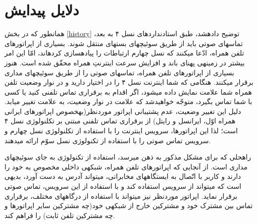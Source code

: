 \section{دلایل پیدایش }
همانطور که در بخش \ref{history} توضیح داده\nf شد، طبق استادنداردهای نسل ۴ به بعد، تماس\nf های صوتی باید از طریق سوئیچ\nf های بسته\nf ای منتقل شوند. بسیاری از اپراتورهای تلفن همراه، ادّعا می\nf کنند که نسل چهارم ارتباطات را پیاده\nf سازی کرده\nf اند، امّا این امر بیشتر در زمینه\nf ی پهنای باند و افزایش سرعت اینترنتِ همراه محقّق شده است. هنوز بسیاری از اپراتورهای تلفن همراه، تماس\nf های صوتی را از طریق سوئیچ\nf های مداری برقرار می\nf کنند. هنگامی که شما اینترنت نسل ۴ را در اختیار دارید و در نوار وضعیت تلفن همراه شما علامت  نمایش داده می\nf شود، اگر اقدام به برقراری تماس تلفنی کنید یا کسی با شما تماس بگیرد، متوجّه خواهیدشد که علامت  در نوار وضعیت، به علامت  تغییر میابد. دلیل این تغییر وضعیت، عدم پشتیبانی اپراتور موردنظر(به\nf خصوص اپراتورهای ایرانی همراه اوّل، ایرانسل و رایتل) از برقراری تماس تلفنی مبتنی بر تکلنولوژی نسل ۴ است؛ لذا این اپراتورها، سرویس اینترنت را با استفاده از تکلنولوژی نسل چهارم و سرویس تماس صوتی را با استفاده از تکنولوژی نسل سوّم ارائه می\nf دهند.

راه\nf حلی که برای مشکل مذکور به ذهن می\nf رسد، استفاده از تکنولوژی  به جای سوئیچ\nf های مداری است. از آنجایی که اپراتورهای تلفن همراه، شبکه\nf ی داخلی مخصوص به خود را دارند و کاربر با اتّصال به ایستگاه\nf های مخابراتی، می\nf تواند آدرس  به دست آورد، بدیهی است که می\nf تواند از سرویس  استفاده کند و با استفاده از این سرویس، تماس صوتی برقرار نماید. اپراتور موردنظر نیز می\nf تواند با استفاده از درگاه\nf های مختلف، برقراری تماس بین مشترک خود و مشترکین خارج از شبکه\nf ی خود(چه مشترکین سایر اپراتورها و چه مشترکین تلفن ثابت) را فراهم کند.


